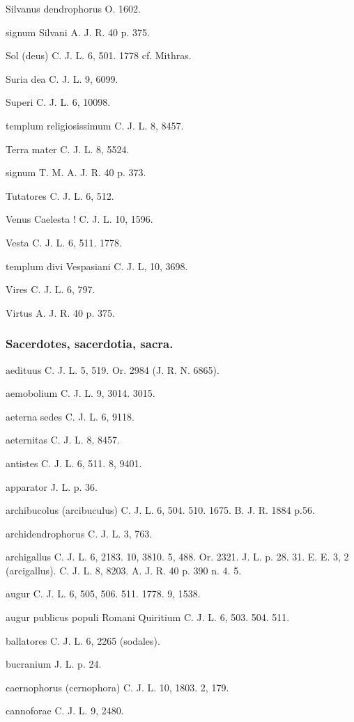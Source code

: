 \documentclass[a4paper, 11pt, oneside, polutonikogreek, german]{article}
\begin{document}
Silvanus dendrophorus O. 1602.

signum Silvani A. J. R. 40 p. 375.

Sol (deus) C. J. L. 6, 501. 1778 cf. Mithras.

Suria dea C. J. L. 9, 6099.

Superi C. J. L. 6, 10098.

templum religiosissimum C. J. L. 8, 8457.

Terra mater C. J. L. 8, 5524.

signum T. M. A. J. R. 40 p. 373.

Tutatores C. J. L. 6, 512.

Venus Caelesta ! C. J. L. 10, 1596.

Vesta C. J. L. 6, 511. 1778.

templum divi Vespasiani C. J. L, 10, 3698.

Vires C. J. L. 6, 797.

Virtus A. J. R. 40 p. 375.

\subsubsection{Sacerdotes, sacerdotia, sacra.}

aedituus C. J. L. 5, 519. Or. 2984 (J. R. N. 6865).

aemobolium C. J. L. 9, 3014. 3015.

aeterna sedes C. J. L. 6, 9118.

aeternitas C. J. L. 8, 8457.

antistes C. J. L. 6, 511. 8, 9401.

apparator J. L. p. 36.

archibucolus (arcibuculus) C. J. L. 6, 504. 510. 1675. B. J. R. 1884 p.56.

archidendrophorus C. J. L. 3, 763.

archigallus C. J. L. 6, 2183. 10, 3810. 5, 488. Or. 2321. J. L. p. 28. 31. E. E. 3, 2 (arcigallus). C. J. L. 8, 8203. A. J. R. 40 p. 390 n. 4. 5.

augur C. J. L. 6, 505, 506. 511. 1778. 9, 1538.

augur publicus populi Romani Quiritium C. J. L. 6, 503. 504. 511.

ballatores C. J. L. 6, 2265 (sodales).

bucranium J. L. p. 24.

caernophorus (cernophora) C. J. L. 10, 1803. 2, 179.

cannoforae C. J. L. 9, 2480.
\end{document}
